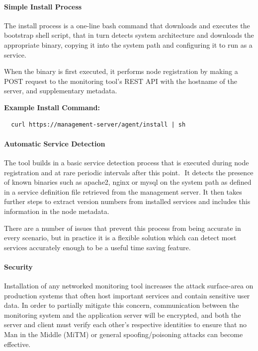 \documentclass{cshonours}
\begin{document}
\paragraph{Simple Install Process} The install process is a one-line bash command that downloads and executes the bootstrap shell script, that in turn detects system architecture and downloads the appropriate binary, copying it into the system path and configuring it to run as a service.

When the binary is first executed, it performs node registration by making a POST request to the monitoring tool’s REST API with the hostname of the server, and supplementary metadata.

\textbf{Example Install Command:}
\begin{verbatim}
  curl https://management-server/agent/install | sh
\end{verbatim}

\paragraph{Automatic Service Detection} The tool builds in a basic service detection process that is executed during node registration and at rare periodic intervals after this point. 
 It detects the presence of known binaries such as apache2, nginx or mysql on the system path as defined in a service definition file retrieved from the management server. It then takes further steps to extract version numbers from installed services and includes this information in the node metadata.

There are a number of issues that prevent this process from being accurate in every scenario, but in practice it is a flexible solution which can detect most services accurately enough to be a useful time saving feature.

\paragraph{Security} Installation of any networked monitoring tool increases the attack surface-area on production systems that often host important services and contain sensitive user data. In order to partially mitigate this concern, communication between the monitoring system and the application server will be encrypted, and both the server and client must verify each other’s respective identities to ensure that no Man in the Middle (MiTM) or general spoofing/poisoning attacks can become effective.
\end{document}
